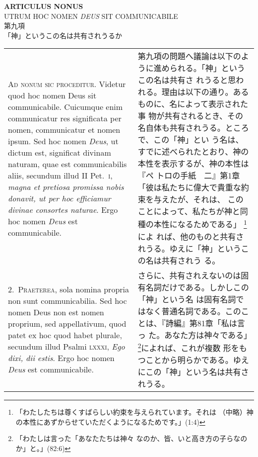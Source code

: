 \documentclass[10pt]{jsarticle} %
\begin{document}
\begin{center}
 {\Large {\bf ARTICULUS NONUS}}\\
 {\large UTRUM HOC NOMEN {\itshape DEUS} SIT COMMUNICABILE}\\
 {\Large 第九項\\「神」というこの名は共有されうるか}
\end{center}

\begin{longtable}{p{21em}p{21em}}


{\huge A}{\scshape d nonum sic proceditur}. Videtur quod hoc nomen Deus
sit communicabile. Cuicumque enim communicatur res significata per
nomen, communicatur et nomen ipsum. Sed hoc nomen {\itshape Deus}, ut
dictum est, significat divinam naturam, quae est communicabilis aliis,
secundum illud II Pet.~{\scshape i}, {\itshape magna et pretiosa
promissa nobis donavit, ut per hoc efficiamur divinae consortes
naturae}. Ergo hoc nomen {\itshape Deus} est communicabile.

&

第九項の問題へ議論は以下のように進められる。「神」というこの名は共有さ
れうると思われる。理由は以下の通り。あるものに、名によって表示された事
物が共有されるとき、その名自体も共有されうる。ところで、この「神」とい
う名は、すでに述べられたとおり、神の本性を表示するが、神の本性は『ペ
トロの手紙　二』第1章「彼は私たちに偉大で貴重な約束を与えたが、それは、
このことによって、私たちが神と同種の本性になるためである」
\footnote{「わたしたちは尊くすばらしい約束を与えられています。それは
（中略）神の本性にあずからせていただくようになるためです。」(1:4)}によ
れば、他のものと共有されうる。ゆえに「神」というこの名は共有されう
る。

\\

2.~{\scshape Praeterea}, sola nomina propria non sunt
communicabilia. Sed hoc nomen Deus non est nomen proprium, sed
appellativum, quod patet ex hoc quod habet plurale, secundum illud
Psalmi {\scshape lxxxi}, {\itshape Ego dixi, dii estis}. Ergo hoc nomen
{\itshape Deus} est communicabile.


&

さらに、共有されえないのは固有名詞だけである。しかしこの「神」という名
は固有名詞ではなく普通名詞である。このことは、『詩編』第81章「私は言っ
た。あなた方は神々である」\footnote{「わたしは言った「あなたたちは神々
なのか、皆、いと高き方の子らなのか」と。」(82:6)}によれば、これが複数
形をもつことから明らかである。ゆえにこの「神」という名は共有されうる。


\end{longtable}
\end{document}
